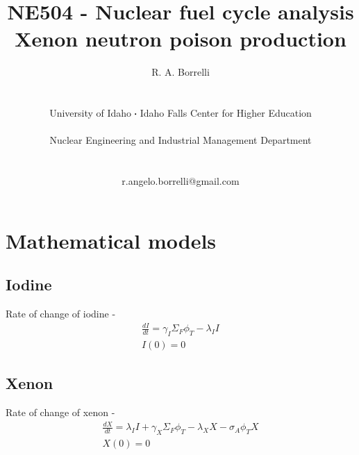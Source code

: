\documentclass[11pt,a4paper]{article}
\newcommand*\sq{\mathbin{\vcenter{\hbox{\rule{.3ex}{.3ex}}}}} %
\begin{document}
\begin{titlepage}
    \title{
        NE504 - Nuclear fuel cycle analysis\\
        Xenon neutron poison production\\
    }
    \author{
        R. A. Borrelli
        \\ \\ \\
        University of Idaho $\sq$ Idaho Falls Center for Higher Education
        \\ \\
        Nuclear Engineering and Industrial Management Department
        \\ \\ \\
        r.angelo.borrelli@gmail.com
    }
\clearpage %
\maketitle
\thispagestyle{empty} %
\end{titlepage}

\section{Mathematical models}
\subsection{Iodine}
Rate of change of iodine - 
\begin{equation} \label{eq-i-dq}
    \begin{gathered}
        \frac{dI}{dt}=\gamma_I \Sigma_F \phi_T-\lambda_I I \\
        I(0)=0
    \end{gathered}
\end{equation}

\subsection{Xenon}
Rate of change of xenon - 
\begin{equation} \label{eq-xe-dq}
    \begin{gathered}
        \frac{dX}{dt}=\lambda_I I + \gamma_X \Sigma_F \phi_T - \lambda_X X - \sigma_A \phi_T X \\
        X(0)=0
    \end{gathered}
\end{equation}
\end{document}
